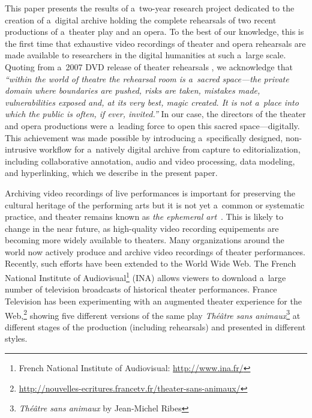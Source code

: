 \documentclass[conference]{IEEEtran}
\newcommand{\todo}[1]{\noindent\textcolor{red}{{\bf \{ToDo} #1{\bf \}}}}
\begin{document}
This paper presents the results of a~two-year research project dedicated to the creation of a~digital archive holding the complete rehearsals of two recent productions of a~theater play and an opera. To the best of our knowledge, this is the first time that exhaustive video recordings of theater and opera rehearsals are made available to researchers in the digital humanities at such a~large scale. Quoting from a~2007 DVD release of theater rehearsals \cite{Darling07}, we acknowledge that  {\em ``within the world of theatre the rehearsal room is a~sacred space---the private domain where boundaries are pushed, risks are taken, mistakes made, vulnerabilities exposed and, at its very best, magic created. It is not a~place into which the public is often, if ever, invited.''} In our case, the directors of the theater and opera productions were a~leading force to open this sacred space---digitally.  This achievement was made possible by introducing a~specifically designed, non-intrusive workflow for a~natively digital archive from capture to editorialization, including collaborative annotation, audio and video processing, data modeling,  and hyperlinking, which we describe in the present paper.






Archiving video recordings of live performances is important for preserving the cultural heritage of the performing arts but it is not yet a~common or systematic practice, and theater remains known as {\em the ephemeral art}~\cite{Reason06,Bouchez07}. This is likely to change in the near future, as high-quality video recording equipements are becoming more widely available to theaters.   Many organizations around the world now actively produce and archive video recordings of theater performances. Recently, such efforts have been extended to the World Wide Web. The French National Institute of Audiovisual\footnote{French National Institute of Audiovisual: \url{http://www.ina.fr/}} (INA) allows viewers to download a~large number of   television broadcasts of historical theater performances. France Television has been experimenting with an augmented theater experience for the Web,\footnote{\url{http://nouvelles-ecritures.francetv.fr/theater-sans-animaux/}} showing five different versions of the same play \emph{Théâtre sans animaux}\footnote{\emph{Théâtre sans animaux} by Jean-Michel Ribes} at different stages of the production (including rehearsals) and presented in different styles. 
\end{document}
